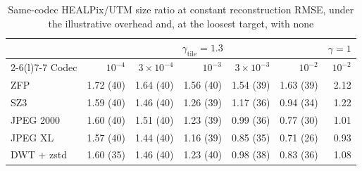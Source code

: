\begin{table}[t]
\centering
\caption{Same-codec HEALPix/UTM size ratio at constant reconstruction RMSE, under the illustrative overhead and, at the loosest target, with none}
\label{tab:fixed_codec}
\footnotesize
\setlength{\tabcolsep}{3pt}
\begin{tabular}{@{}lrrrrrr@{}}
\toprule
 & \multicolumn{5}{c}{$\gamma_{\mathrm{tile}}=1.3$} & $\gamma{=}1$ \\
\cmidrule(lr){2-6}\cmidrule(l){7-7}
Codec & $10^{-4}$ & $3\times10^{-4}$ & $10^{-3}$ & $3\times10^{-3}$ & $10^{-2}$ & $10^{-2}$ \\
\midrule
ZFP & 1.72 (40) & 1.64 (40) & 1.56 (40) & 1.54 (39) & 1.63 (39) & 2.12 \\
SZ3 & 1.59 (40) & 1.46 (40) & 1.26 (39) & 1.17 (36) & 0.94 (34) & 1.22 \\
JPEG 2000 & 1.60 (40) & 1.51 (40) & 1.23 (39) & 0.99 (36) & 0.77 (30) & 1.01 \\
JPEG XL & 1.57 (40) & 1.44 (40) & 1.16 (39) & 0.85 (35) & 0.71 (26) & 0.93 \\
DWT + zstd & 1.60 (35) & 1.46 (40) & 1.23 (40) & 0.98 (38) & 0.83 (36) & 1.08 \\
\bottomrule
\end{tabular}
\end{table}
